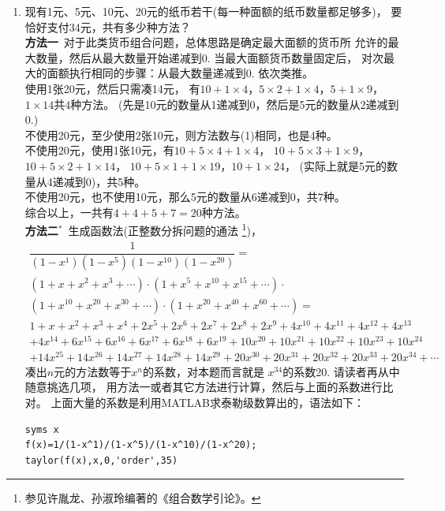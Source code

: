\begin{enumerate}[label={【\textbf{例\thechapter.\arabic*}】},
 leftmargin=\inteval{\myenumleftmargin}pt,
 itemsep=\inteval{\myenumitempsep}pt,
 itemindent=\inteval{\myenumitemindent}pt]
\item 现有1元、5元、10元、20元的纸币若干(每一种面额的纸币数量都足够多)，
要恰好支付34元，共有多少种方法？ \\
\textbf{方法一}\ 对于此类货币组合问题，总体思路是确定最大面额的货币所
允许的最大数量，然后从最大数量开始递减到0. 当最大面额货币数量固定后，
对次最大的面额执行相同的步骤：从最大数量递减到0. 依次类推。\\
 使用1张20元，然后只需凑14元，
有$ 10+1\times 4 $，$ 5\times 2+
1\times 4 $，$ 5+1\times 9 $，$ 1\times 14 $共4种方法。
(先是10元的数量从1递减到0，然后是5元的数量从2递减到0.)\\
 不使用20元，至少使用2张10元，则方法数与(1)相同，也是4种。\\
 不使用20元，使用1张10元，有$ 10+5\times 4+1\times 4 $，
$ 10+5\times 3+1\times 9 $，$ 10+5\times 2+1\times 14 $，
$ 10+5\times 1+1\times 19 $，$ 10+1\times 24 $，
(实际上就是5元的数量从4递减到0)，共5种。\\
 不使用20元，也不使用10元，那么5元的数量从6递减到0，共7种。\\
综合以上，一共有$ 4+4+5+7=20 $种方法。\\
\textbf{方法二}$ ^* $\ 生成函数法(正整数分拆问题的通法
\footnote{参见许胤龙、孙淑玲编著的《组合数学引论》。})，
\begin{gather*}
    \dfrac{1}{(1-x^1)(1-x^5)(1-x^{10})(1-x^{20})}=\\
(1+x+x^2+x^3+\cdots)\cdot(1+x^5+x^{10}+x^{15}+\cdots)\cdot\\
(1+x^{10}+x^{20}+x^{30}+\cdots)\cdot(1+x^{20}+x^{40}+x^{60}+\cdots)=\\
1+x+x^{2}+x^{3}+x^{4}+2x^{5}+2x^{6}+2x^{7}+2x^{8}+2x^{9}+4x^{10}+4x^{11}+4x^{12}+4x^{13}\\
+4x^{14}+6x^{15}+6x^{16}+6x^{17}+6x^{18}+6x^{19}+10x^{20}+10x^{21}+10x^{22}+10x^{23}+10x^{24}\\
+14x^{25}+14x^{26}+14x^{27}+14x^{28}+14x^{29}+20x^{30}+20x^{31}+20x^{32}+20x^{33}+20x^{34}+\cdots
\end{gather*}
凑出$ n $元的方法数等于$ x^n $的系数，对本题而言就是
$ x^{34} $的系数20. 请读者再从中随意挑选几项，
用方法一或者其它方法进行计算，然后与上面的系数进行比对。
上面大量的系数是利用MATLAB求泰勒级数算出的，语法如下：
\begin{lstlisting}
syms x
f(x)=1/(1-x^1)/(1-x^5)/(1-x^10)/(1-x^20);
taylor(f(x),x,0,'order',35)    
\end{lstlisting} 


\end{enumerate}
